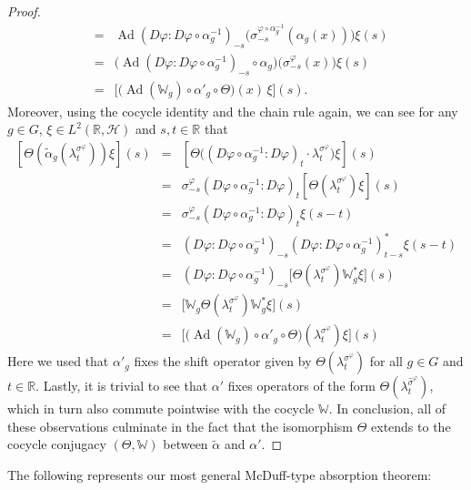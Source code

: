 \documentclass[11pt,a4paper]{article}
\theoremstyle{definition}
\theoremstyle{remark}
\numberwithin{equation}{section}
\numberwithin{theorem}{section}
\newcommand{\R}{\mathbb{R}}
\renewcommand{\tilde}{\widetilde}
\begin{document}
\begin{proof}
\[\begin{array}{ccl}
&=& \operatorname{Ad}(D\varphi: D\varphi\circ\alpha_g^{-1})_{-s}\Big( \sigma_{-s}^{\varphi\circ\alpha_g^{-1}}(\alpha_g(x)) \Big)\xi(s) \\
&=& \Big(\operatorname{Ad}(D\varphi: D\varphi\circ\alpha_g^{-1})_{-s}\circ\alpha_g\Big) \big( \sigma^\varphi_{-s}(x) \big)\xi(s) \\
&=& \Big[ \Big( \operatorname{Ad}(\mathbb{W}_g)\circ\alpha'_g\circ\Theta\Big)(x)\, \xi \Big](s).
\end{array}
\]
Moreover, using the cocycle identity and the chain rule again, we can see for any $g \in G$, $\xi \in L^2(\R,\mathcal{H})$ and $s,t \in \R$ that
\[
\begin{array}{ccl}
[\Theta(\tilde{\alpha}_g(\lambda^{\sigma^\varphi}_t))\xi](s) &=& [\Theta\big( (D \varphi\circ\alpha_g^{-1} : D\varphi)_t\cdot\lambda^{\sigma^\varphi}_t \big)\xi](s) \\
&=& \sigma^{\varphi}_{-s}(D \varphi\circ\alpha_g^{-1} : D\varphi)_t [ \Theta(\lambda^{\sigma^\varphi}_t)\xi ](s) \\
&=& \sigma^{\varphi}_{-s}(D \varphi\circ\alpha_g^{-1} : D\varphi)_t \xi(s-t) \\
&=& (D\varphi: D\varphi\circ\alpha_g^{-1})_{-s} (D\varphi: D\varphi\circ\alpha_g^{-1})_{t-s}^* \xi(s-t) \\
&=& (D\varphi: D\varphi\circ\alpha_g^{-1})_{-s} \Big[ \Theta(\lambda_t^{\sigma^\varphi}) \mathbb{W}_g^* \xi \Big](s) \\
&=& \Big[ \mathbb{W}_g \Theta(\lambda_t^{\sigma^\varphi}) \mathbb{W}_g^* \xi \Big](s) \\
&=& \Big[ \Big( \operatorname{Ad}(\mathbb{W}_g)\circ\alpha'_g\circ\Theta\Big)(\lambda_t^{\sigma^\varphi}) \xi \Big](s)
\end{array}
\]
Here we used that $\alpha'_g$ fixes the shift operator given by $\Theta(\lambda^{\sigma^\varphi}_t)$ for all $g\in G$ and $t\in\mathbb{R}$.
Lastly, it is trivial to see that $\alpha'$ fixes operators of the form $\Theta(\lambda^{\hat{\sigma}^\varphi}_t)$, which in turn also commute pointwise with the cocycle $\mathbb{W}$.
%
In conclusion, all of these observations culminate in the fact that the isomorphism $\Theta$ extends to the cocycle conjugacy $(\Theta,\mathbb{W})$ between $\tilde{\alpha}$ and $\alpha'$.
\end{proof}

The following represents our most general McDuff-type absorption theorem:
\end{document}
